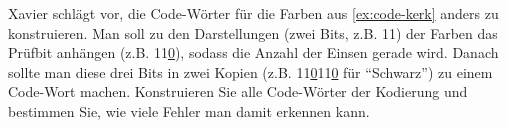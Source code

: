 \begin{myexercise}\label{ex:xavier}
Xavier schlägt vor, die Code-Wörter für die Farben aus \cref{ex:code-kerk} anders zu konstruieren. Man soll zu den Darstellungen (zwei Bits, z.B. 11) der Farben das Prüfbit anhängen (z.B. 11\underline{0}), sodass die Anzahl der Einsen gerade wird. Danach sollte man diese drei Bits in zwei Kopien (z.B. 11\underline{0}11\underline{0} für \enquote{Schwarz}) zu einem Code-Wort machen. Konstruieren Sie alle Code-Wörter der Kodierung und bestimmen Sie, wie viele Fehler man damit erkennen kann.
\end{myexercise}
